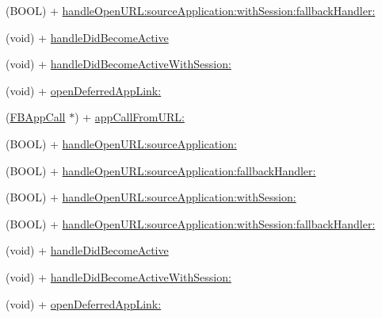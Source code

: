 \begin{DoxyCompactItemize}
\item 
(B\+O\+OL) + \hyperlink{interfaceFBAppCall_aab019d4dfc227c0a69627e9f666905ea}{handle\+Open\+U\+R\+L\+:source\+Application\+:with\+Session\+:fallback\+Handler\+:}
\item 
(void) + \hyperlink{interfaceFBAppCall_ae38f6595e03e0ba2c44670e7ff579a70}{handle\+Did\+Become\+Active}
\item 
(void) + \hyperlink{interfaceFBAppCall_aa00467d180eab724577daeeb205524a4}{handle\+Did\+Become\+Active\+With\+Session\+:}
\item 
(void) + \hyperlink{interfaceFBAppCall_a02498c71e0be169b1ae49136d1446a23}{open\+Deferred\+App\+Link\+:}
\item 
(\hyperlink{interfaceFBAppCall}{F\+B\+App\+Call} $\ast$) + \hyperlink{interfaceFBAppCall_a03baee771317510fb167dad8926bc176}{app\+Call\+From\+U\+R\+L\+:}
\item 
(B\+O\+OL) + \hyperlink{interfaceFBAppCall_a199dea04bcd5f045d222a0c98901a3b9}{handle\+Open\+U\+R\+L\+:source\+Application\+:}
\item 
(B\+O\+OL) + \hyperlink{interfaceFBAppCall_ad685be8d03104cb8aa1f2b6ccf770d5d}{handle\+Open\+U\+R\+L\+:source\+Application\+:fallback\+Handler\+:}
\item 
(B\+O\+OL) + \hyperlink{interfaceFBAppCall_af20b1ba0f8f11d335d8ca28b2450cf9d}{handle\+Open\+U\+R\+L\+:source\+Application\+:with\+Session\+:}
\item 
(B\+O\+OL) + \hyperlink{interfaceFBAppCall_aab019d4dfc227c0a69627e9f666905ea}{handle\+Open\+U\+R\+L\+:source\+Application\+:with\+Session\+:fallback\+Handler\+:}
\item 
(void) + \hyperlink{interfaceFBAppCall_ae38f6595e03e0ba2c44670e7ff579a70}{handle\+Did\+Become\+Active}
\item 
(void) + \hyperlink{interfaceFBAppCall_aa00467d180eab724577daeeb205524a4}{handle\+Did\+Become\+Active\+With\+Session\+:}
\item 
(void) + \hyperlink{interfaceFBAppCall_a02498c71e0be169b1ae49136d1446a23}{open\+Deferred\+App\+Link\+:}
\end{DoxyCompactItemize}
